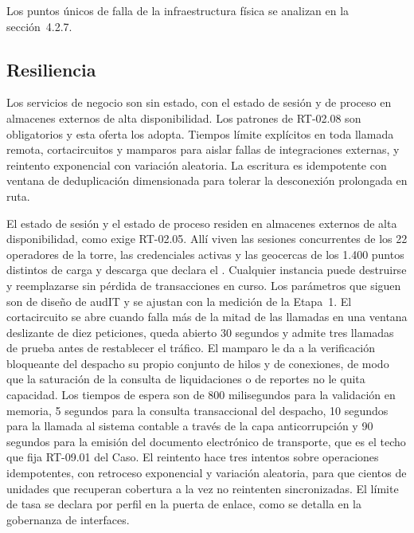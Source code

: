 Los puntos únicos de falla de la infraestructura física se analizan en la sección~4.2.7.

\subsection{Resiliencia}\label{sec:4-resiliencia}

Los servicios de negocio son sin estado, con el estado de sesión y de proceso en almacenes externos de
alta disponibilidad. Los patrones de RT-02.08 son obligatorios y esta oferta los adopta. Tiempos
límite explícitos en toda llamada remota, cortacircuitos y mamparos para aislar fallas de
integraciones externas, y reintento exponencial con variación aleatoria. La escritura es idempotente
con ventana de deduplicación dimensionada para tolerar la desconexión prolongada en ruta.

El estado de sesión y el estado de proceso residen en almacenes externos de alta disponibilidad, como
exige RT-02.05. Allí viven las sesiones concurrentes de los 22 operadores de la torre, las credenciales
activas y las geocercas de los 1.400 puntos distintos de carga y descarga que declara el
. Cualquier instancia puede destruirse y reemplazarse sin pérdida de
transacciones en curso. Los parámetros que siguen son de diseño de audIT y se ajustan con la
medición de la Etapa~1. El cortacircuito se abre cuando falla más de la mitad de las llamadas en una
ventana deslizante de diez peticiones, queda abierto 30 segundos y admite tres llamadas de prueba antes
de restablecer el tráfico. El mamparo le da a la verificación bloqueante del despacho su propio conjunto
de hilos y de conexiones, de modo que la saturación de la consulta de liquidaciones o de reportes no le
quita capacidad. Los tiempos de espera son de 800 milisegundos para la validación en memoria, 5 segundos
para la consulta transaccional del despacho, 10 segundos para la llamada al sistema contable a través
de la capa anticorrupción y 90 segundos para la emisión del documento electrónico de transporte, que es
el techo que fija RT-09.01 del Caso. El reintento hace tres intentos sobre operaciones idempotentes, con
retroceso exponencial y variación aleatoria, para que cientos de unidades que recuperan cobertura a la
vez no reintenten sincronizadas. El límite de tasa se declara por perfil en la puerta de enlace, como se
detalla en la gobernanza de interfaces.


